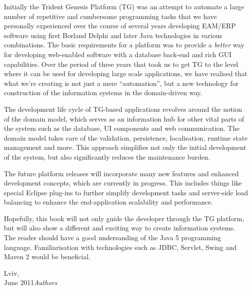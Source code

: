 %
%

\preface
  Initially the Trident Genesis Platform (TG) was an attempt to automate a large number of repetitive and cumbersome programming tasks that we have personally  experienced over the course of several years developing EAM/ERP software using first Borland Delphi and later Java technologies in various combinations.
  The basic requirements for a platform was to provide a \emph{better} way for developing web-enabled software with a database back-end and rich GUI capabilities.
  Over the period of three years that took us to get TG to the level where it can be used for developing large scale applications, we have realised that what we're creating is not just a mere ``automation'', but a new technology for construction of the information systems in the domain-driven way.
  
  The development life cycle of TG-based applications revolves around the notion of the domain model, which serves as an information hub for other vital parts of the system such as the database, UI components and web communication.
  The domain model takes care of the validation, persistence, localisation, runtime state management and more.
  This approach simplifies not only the initial development of the system, but also significantly reduces the maintenance burden.

  The future platform releases will incorporate many new features and enhanced development concepts, which are currently in progress. 
  This includes things like special Eclipse plug-ins to further simplify development tasks and server-side load balancing to enhance the end-application scalability and performance.

  Hopefully, this book will not only guide the developer through the TG platform, but will also show a different and exciting way to create information systems.
  The reader should have a good undersanding of the Java 5 programming language. Familiarisation with technologies such as JDBC, Servlet, Swing and Maven 2 would be beneficial.
  
\vspace{\baselineskip}
\begin{flushright}\noindent
Lviv,\hfill ~\\
June 2011\hfill {\it Authors}\\
\end{flushright}


